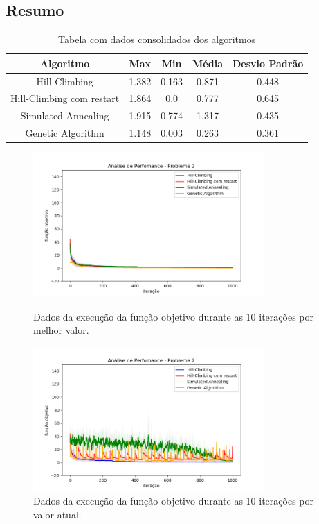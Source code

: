 \subsection{Resumo}

\begin{table}[h!]
\centering
\begin{tabular}{ |c|c|c|c|c|  }
\hline
\rowcolor{lightgray}
Algoritmo & Max & Min & Média & Desvio Padrão \\
\hline
Hill-Climbing & 1.382 & 0.163 & 0.871 & 0.448 \\
\hline
Hill-Climbing com restart & 1.864 & 0.0 & 0.777 & 0.645 \\
\hline
Simulated Annealing & 1.915 & 0.774 & 1.317 & 0.435 \\
\hline
Genetic Algorithm & 1.148 & 0.003 & 0.263 & 0.361 \\
\hline

\end{tabular}
\caption{Tabela com dados consolidados dos algoritmos}
\end{table}

\begin{figure}[H]
\centering
  \begin{minipage}[b]{0.48\textwidth}
    \includegraphics[width=88mm]{imagens/otima/problema-2-performance-algoritmos-best.png}
    \caption{Dados da execução da função objetivo durante as 10 iterações por melhor valor.
    \label{fig:problema-2-performance-algoritmos-best}}
  \end{minipage}
  \hfill
  \begin{minipage}[b]{0.48\textwidth}
    \includegraphics[width=88mm]{imagens/otima/problema-2-performance-algoritmos-value.png}
    \caption{Dados da execução da função objetivo durante as 10 iterações por valor atual.
    \label{fig:problema-2-performance-algoritmos-value}}
  \end{minipage}
\end{figure}